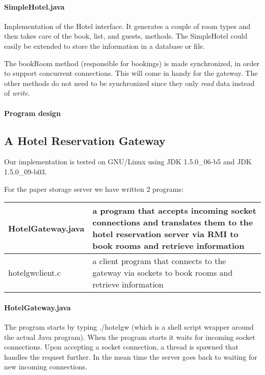 \documentclass[a4paper,10pt]{article}
\begin{document}
\paragraph{SimpleHotel.java}
Implementation of the Hotel interface. It generates a couple of room types and then takes care of the book, list, and guests, methods. The SimpleHotel could easily be extended to store the information in a database or file.

The bookRoom method (responsible for bookings) is made synchronized, in order to support concurrent connections. This will come in handy for the gateway. The other methods do not need to be synchronized since they only \emph{read} data instead of \emph{write}.

\paragraph{Program design}


\subsection{A Hotel Reservation Gateway}

Our implementation is tested on GNU/Linux using JDK 1.5.0\_06-b5 and JDK 1.5.0\_09-b03.

For the paper storage server we have written 2 programs:
\begin{center}
\begin{tabular}{ l | p{8.2cm} }
HotelGateway.java & a program that accepts incoming socket connections and translates them to the hotel reservation server via RMI to book rooms and retrieve information\\ \hline
hotelgwclient.c & a client program that connects to the gateway via sockets to book rooms and retrieve information\\
\end{tabular}
\end{center}

\paragraph{HotelGateway.java}
The program starts by typing ./hotelgw (which is a shell script wrapper around the actual Java program). When the program starts it waits for incoming socket connections. Upon accepting a socket connection, a thread is spawned that handles the request further. In the mean time the server goes back to waiting for new incoming connections.
\end{document}
